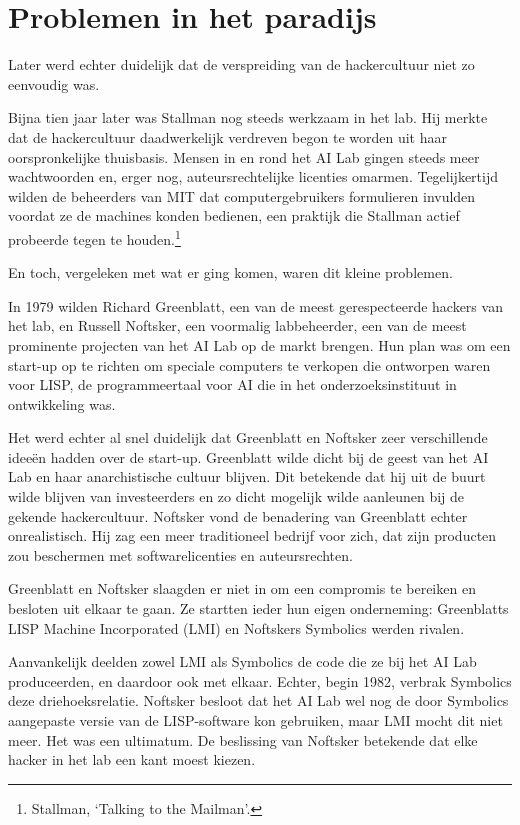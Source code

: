 \documentclass[
  a5paper,
  smalldemyvopaper,11pt,twoside,onecolumn,openright,extrafontsizes]{memoir}
\begin{document}
\section{Problemen in het paradijs}\label{problemen-in-het-paradijs}

Later werd echter duidelijk dat de verspreiding van de hackercultuur
niet zo eenvoudig was.

Bijna tien jaar later was Stallman nog steeds werkzaam in het lab. Hij
merkte dat de hackercultuur daadwerkelijk verdreven begon te worden uit
haar oorspronkelijke thuisbasis. Mensen in en rond het AI Lab gingen
steeds meer wachtwoorden en, erger nog, auteursrechtelijke licenties
omarmen. Tegelijkertijd wilden de beheerders van MIT dat
computergebruikers formulieren invulden voordat ze de machines konden
bedienen, een praktijk die Stallman actief probeerde tegen te
houden.\footnote{\hspace{0pt}Stallman, `Talking to the Mailman'.}

En toch, vergeleken met wat er ging komen, waren dit kleine problemen.

In 1979 wilden Richard Greenblatt, een van de meest gerespecteerde
hackers van het lab, en Russell Noftsker, een voormalig labbeheerder,
een van de meest prominente projecten van het AI Lab op de markt
brengen. Hun plan was om een start-up op te richten om speciale
computers te verkopen die ontworpen waren voor LISP, de programmeertaal
voor AI die in het onderzoeksinstituut in ontwikkeling was.

Het werd echter al snel duidelijk dat Greenblatt en Noftsker zeer
verschillende ideeën hadden over de start-up. Greenblatt wilde dicht bij
de geest van het AI Lab en haar anarchistische cultuur blijven. Dit
betekende dat hij uit de buurt wilde blijven van investeerders en zo
dicht mogelijk wilde aanleunen bij de gekende hackercultuur. Noftsker
vond de benadering van Greenblatt echter onrealistisch. Hij zag een meer
traditioneel bedrijf voor zich, dat zijn producten zou beschermen met
softwarelicenties en auteursrechten.

Greenblatt en Noftsker slaagden er niet in om een compromis te bereiken
en besloten uit elkaar te gaan. Ze startten ieder hun eigen onderneming:
Greenblatts LISP Machine Incorporated (LMI) en Noftskers Symbolics
werden rivalen.

Aanvankelijk deelden zowel LMI als Symbolics de code die ze bij het AI
Lab produceerden, en daardoor ook met elkaar. Echter, begin 1982,
verbrak Symbolics deze driehoeksrelatie. Noftsker besloot dat het AI Lab
wel nog de door Symbolics aangepaste versie van de LISP-software kon
gebruiken, maar LMI mocht dit niet meer. Het was een ultimatum. De
beslissing van Noftsker betekende dat elke hacker in het lab een kant
moest kiezen.
\end{document}
